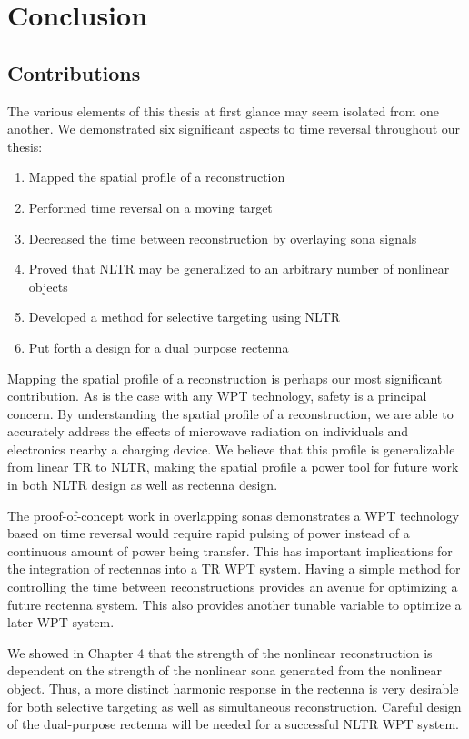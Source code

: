 \chapter{Conclusion}

\label{ch:conclusion}

\section{Contributions}

The various elements of this thesis at first glance may seem isolated from one another. We demonstrated six significant aspects to time reversal throughout our thesis:

\begin{enumerate}
\item Mapped the spatial profile of a reconstruction
\item Performed time reversal on a moving target
\item Decreased the time between reconstruction by overlaying sona signals
\item Proved that NLTR may be generalized to an arbitrary number of nonlinear objects
\item Developed a method for selective targeting using NLTR
\item Put forth a design for a dual purpose rectenna
\end{enumerate}

Mapping the spatial profile of a reconstruction is perhaps our most significant contribution. As is the case with any WPT technology, safety is a principal concern. By understanding the spatial profile of a reconstruction, we are able to accurately address the effects of microwave radiation on individuals and electronics nearby a charging device. We believe that this profile is generalizable from linear TR to NLTR, making the spatial profile a power tool for future work in both NLTR design as well as rectenna design.

The proof-of-concept work in overlapping sonas demonstrates a WPT technology based on time reversal would require rapid pulsing of power instead of a continuous amount of power being transfer. This has important implications for the integration of rectennas into a TR WPT system. Having a simple method for controlling the time between reconstructions provides an avenue for optimizing a future rectenna system. This also provides another tunable variable to optimize a later WPT system.

We showed in Chapter 4 that the strength of the nonlinear reconstruction is dependent on the strength of the nonlinear sona generated from the nonlinear object. Thus, a more distinct harmonic response in the rectenna is very desirable for both selective targeting as well as simultaneous reconstruction. Careful design of the dual-purpose rectenna will be needed for a successful NLTR WPT system.

